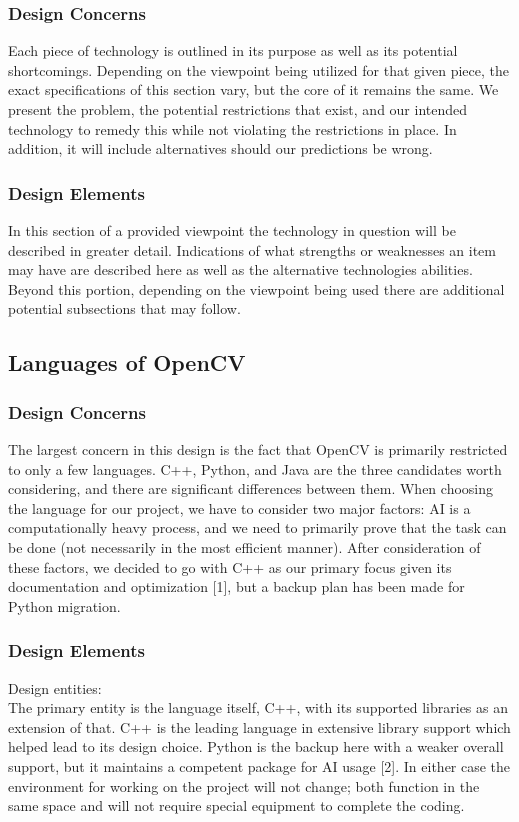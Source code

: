 \documentclass[onecolumn, draftclsnofoot,10pt, compsoc]{IEEEtran}
\begin{document}
\subsubsection{Design Concerns}
Each piece of technology is outlined in its purpose as well as its potential shortcomings. Depending on the viewpoint being utilized for that given piece, the exact specifications of this section vary, but the core of it remains the same. We present the problem, the potential restrictions that exist, and our intended technology to remedy this while not violating the restrictions in place. In addition, it will include alternatives should our predictions be wrong.

\subsubsection{Design Elements}
In this section of a provided viewpoint the technology in question will be described in greater detail. Indications of what strengths or weaknesses an item may have are described here as well as the alternative technologies abilities. Beyond this portion, depending on the viewpoint being used there are additional potential subsections that may follow.

\subsection{Languages of OpenCV}
\subsubsection{Design Concerns}
The largest concern in this design is the fact that OpenCV is primarily restricted to only a few languages. C++, Python, and Java are the three candidates worth considering, and there are significant differences between them. When choosing the language for our project, we have to consider two major factors: AI is a computationally heavy process, and we need to primarily prove that the task can be done (not necessarily in the most efficient manner). After consideration of these factors, we decided to go with C++ as our primary focus given its documentation and optimization [1], but a backup plan has been made for Python migration.

\subsubsection{Design Elements}
	Design entities: \\
The primary entity is the language itself, C++, with its supported libraries as an extension of that. C++ is the leading language in extensive library support which helped lead to its design choice. Python is the backup here with a weaker overall support, but it maintains a competent package for AI usage [2]. In either case the environment for working on the project will not change; both function in the same space and will not require special equipment to complete the coding.\\
\end{document}

